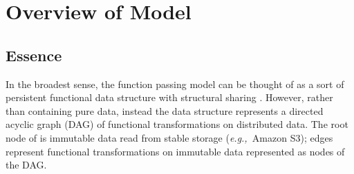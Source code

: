 \documentclass[preprint]{sigplanconf}
\theoremstyle{definition}
\theoremstyle{definition}
\newcommand{\eg}{{\em e.g.,~}}
\begin{document}


%
%
%
%
%
%
%

\section{Overview of Model}
\label{sec:basic-model}

\subsection{Essence}

In the broadest sense, the function passing model can be thought of as a sort of
persistent functional data structure with structural sharing
. However, rather than containing pure data, instead the data
structure represents a directed acyclic graph (DAG) of functional
transformations on distributed data. The root node of is  immutable data read from stable storage (\eg Amazon S3); edges
represent functional transformations on immutable data represented as nodes of
the DAG. 
\end{document}
